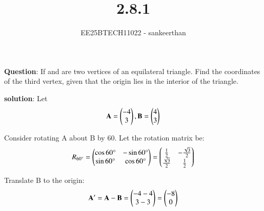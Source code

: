 \documentclass[journal]{IEEEtran}
\begin{document}


\title{2.8.1}
\author{EE25BTECH11022 - sankeerthan}
{\let\newpage\relax\maketitle}

\renewcommand{\thefigure}{\theenumi}
\renewcommand{\thetable}{\theenumi}
\setlength{\intextsep}{10pt} %


\renewcommand{\thetable}{\theenumi}

\textbf{Question}: If  and  are two vertices of an equilateral triangle. Find the coordinates of the third vertex, given that the origin lies in the interior of the triangle.

\textbf{solution}: Let 
\begin{align}

\vec{A}= \myvec{-4 \\ 3}, \vec{B}= \myvec{4 \\ 3}
\end{align}

Consider rotating  A  about  B  by 60\degree .
Let the rotation matrix be:
\begin{align}
R_{60\degree} =
\begin{pmatrix}
\cos 60\degree & -\sin 60\degree \\
\sin 60\degree & \cos 60\degree
\end{pmatrix}
=
\begin{pmatrix}\frac{1}{2} & -\frac{\sqrt{3}}{2} \\
\frac{\sqrt{3}}{2} & \frac{1}{2} \end{pmatrix}
\end{align}

Translate  B  to the origin:
\begin{align}
\mathbf{A'} = \mathbf{A} - \mathbf{B} = \begin{pmatrix}-4-4 \\ 3-3\end{pmatrix} = \begin{pmatrix}-8 \\ 0\end{pmatrix}
\end{align}
\end{document}
